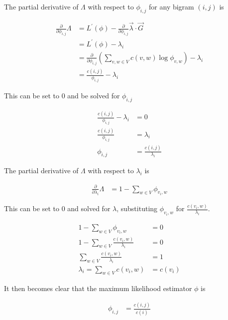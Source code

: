 \documentclass[11pt]{article}
\begin{document}
The partial derivative of $\Lambda$ with respect to $\phi_{i, j}$ for any bigram $\left( i, j \right)$ is

\begin{align*}
%
\frac{\partial}{\partial \phi_{i, j}} \Lambda &= L^\prime \left( \phi \right) - \frac{\partial}{\partial \phi_{i, j}} \vec{\lambda} \cdot \vec{G} \\
%
&= L^\prime \left( \phi \right) - \lambda_i \\
%
&= \frac{\partial}{\partial \phi_{i, j}} \left( \sum \limits_{v, w \in V} c \! \left( v, w \right) \log{\phi_{v, w}} \right) - \lambda_i \\
%
&= \frac{c \left( i, j \right)}{\phi_{i, j}} - \lambda_i
\end{align*}

This can be set to $0$ and be solved for $\phi_{i, j}$

\begin{align*}
\frac{c \left( i, j \right)}{\phi_{i, j}} - \lambda_i &= 0 \\
%
\frac{c \left( i, j \right)}{\phi_{i, j}} &= \lambda_i \\
%
\phi_{i, j} &= \frac{c \left( i, j \right)}{\lambda_i}
\end{align*}

The partial derivative of $\Lambda$ with respect to $\lambda_i$ is

\begin{align*}
\frac{\partial}{\partial \lambda_i} \Lambda &= 1 - \sum \limits_{w \in V} \phi_{v_i, w}
\end{align*}

This can be set to $0$ and solved for $\lambda$, substituting $\phi_{v_i, w}$ for $ \frac{c \left( v_i, w \right)}{\lambda_i}$.

\begin{align*}
1 - \sum \limits_{w \in V} \phi_{v_i, w} &= 0 \\
%
1 - \sum \limits_{w \in V}  \frac{c \left( v_i, w \right)}{\lambda_i} &= 0 \\
%
\sum \limits_{w \in V}  \frac{c \left( v_i, w \right)}{\lambda_i} &= 1 \\
%
\lambda_i = \sum \limits_{w \in V} c \left( v_i, w \right) &= c \left( v_i \right)
\end{align*}

It then becomes clear that the maximum likelihood estimator $\phi$ is

\begin{align*}
\phi_{i, j} &= \frac{c \left( i, j \right)}{c \left( i \right)}
\end{align*}
\end{document}

